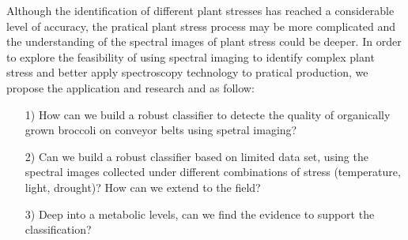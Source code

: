 \documentclass[11pt]{article}
\begin{document}
\begin{linenumbers}
Although the identification of different plant stresses has reached a considerable level of accuracy, the pratical plant stress process may be more complicated and the understanding of the spectral images of plant stress could be deeper. In order to explore the feasibility of using spectral imaging to identify complex plant stress and better apply spectroscopy technology to pratical production, we propose the application and research and as follow: 
\begin{itemize} 
	\item [1)] How can we build a robust classifier to detecte the quality of organically grown broccoli on conveyor belts using spetral imaging? 
	\item [2)] Can we build a robust classifier based on limited data set, using the spectral images collected under different combinations of stress (temperature, light, drought)? How can we extend to the field?
	\item [3)] Deep into a metabolic levels, can we find the evidence to support the classification?
\end{itemize}
\end{linenumbers}
\end{document}
